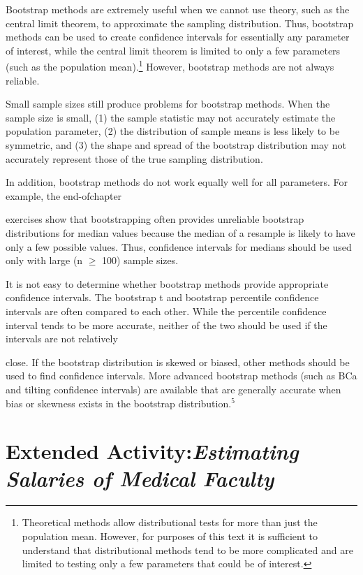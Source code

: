 \documentclass[
]{report}
\theoremstyle{definition}
\theoremstyle{definition}
\theoremstyle{definition}
\theoremstyle{definition}
\theoremstyle{remark}
\begin{document}
Bootstrap methods are extremely useful when we cannot use theory, such as the central limit theorem, to
approximate the sampling distribution. Thus, bootstrap methods can be used to create confidence intervals
for essentially any parameter of interest, while the central limit theorem is limited to only a few parameters
(such as the population mean).\footnote{Theoretical methods allow distributional tests for more than just the population mean. However, for purposes of this text it is sufficient to understand that distributional methods tend to be more complicated and are limited to testing only a few
  parameters that could be of interest.} However, bootstrap methods are not always reliable.

Small sample sizes still produce problems for bootstrap methods. When the sample size is small, (1) the sample statistic may not accurately estimate the population parameter, (2) the distribution of sample means is less likely to be symmetric, and (3) the shape and spread of the bootstrap distribution may not accurately represent those of the true sampling distribution.

In addition, bootstrap methods do not work equally well for all parameters. For example, the end-ofchapter

exercises show that bootstrapping often provides unreliable bootstrap distributions for median values because the median of a resample is likely to have only a few possible values. Thus, confidence intervals for medians should be used only with large (n \(\geq\) 100) sample sizes.

It is not easy to determine whether bootstrap methods provide appropriate confidence intervals. The bootstrap t and bootstrap percentile confidence intervals are often compared to each other. While the percentile confidence interval tends to be more accurate, neither of the two should be used if the intervals are not relatively

close. If the bootstrap distribution is skewed or biased, other methods should be used to find confidence intervals. More advanced bootstrap methods (such as BCa and tilting confidence intervals) are available that are generally accurate when bias or skewness exists in the bootstrap distribution.\(^5\)

\hypertarget{extended-activityestimating-salaries-of-medical-faculty}{%
\section*{\texorpdfstring{Extended Activity:\emph{Estimating Salaries of Medical Faculty}}{Extended Activity:Estimating Salaries of Medical Faculty}}\label{extended-activityestimating-salaries-of-medical-faculty}}
\end{document}
